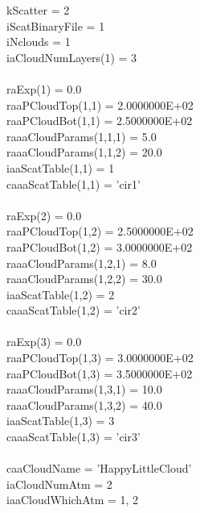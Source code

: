 \documentclass[12pt]{article}
\newcommand{\ttab}{\indent\indent}
\begin{document}
{{\smallskip\noindent
\ttab kScatter         =           2\\
\ttab iScatBinaryFile  =           1\\
\ttab iNclouds         =           1\\
\ttab iaCloudNumLayers(1)    =     3\\
\ttab \\
\ttab \ttab   raExp(1) =  0.0\\
\ttab \ttab   raaPCloudTop(1,1) =  2.0000000E+02\\
\ttab \ttab   raaPCloudBot(1,1) =  2.5000000E+02\\
\ttab \ttab   raaaCloudParams(1,1,1)       = 5.0  \\
\ttab \ttab   raaaCloudParams(1,1,2)       = 20.0  \\
\ttab \ttab   iaaScatTable(1,1)    =  1\\
\ttab \ttab   caaaScatTable(1,1)   =  'cir1'\\
\ttab \\
\ttab \ttab   raExp(2) =  0.0\\
\ttab \ttab   raaPCloudTop(1,2) =  2.5000000E+02 \\
\ttab \ttab   raaPCloudBot(1,2) =  3.0000000E+02\\
\ttab \ttab   raaaCloudParams(1,2,1)       = 8.0  \\
\ttab \ttab   raaaCloudParams(1,2,2)       = 30.0  \\
\ttab \ttab   iaaScatTable(1,2)    =  2 \\
\ttab \ttab   caaaScatTable(1,2)   =  'cir2'\\
\ttab \\
\ttab \ttab   raExp(3) =  0.0\\
\ttab \ttab   raaPCloudTop(1,3) =  3.0000000E+02 \\
\ttab \ttab   raaPCloudBot(1,3) =  3.5000000E+02 \\
\ttab \ttab   raaaCloudParams(1,3,1)       = 10.0 \\
\ttab \ttab   raaaCloudParams(1,3,2)       = 40.0 \\ 
\ttab \ttab   iaaScatTable(1,3)    =  3 \\
\ttab \ttab   caaaScatTable(1,3)   =  'cir3' \\
\ttab \\
\ttab caaCloudName   =  'HappyLittleCloud' \\
\ttab iaCloudNumAtm  =             2       \\
\ttab iaaCloudWhichAtm       =     1, 2   \\

}}
\end{document}

